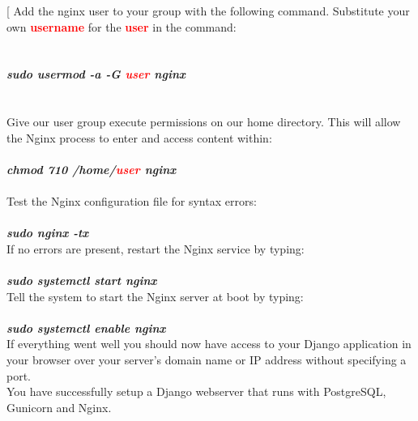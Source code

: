 \documentclass[a4paper]{article}
\makeatletter
\def\step{%
	\@ifnextchar[ \@myitem{\@noitemargtrue\@myitem[\@itemlabel]}}
\def\@myitem[#1]{\item[#1]\mbox{}\\}
\newenvironment{Step}{%
	\begin{enumerate}[label= \textbf {Step} \arabic*,align=left, leftmargin=1.0cm]%
	}{
\end{enumerate}%
}
\makeatother
\begin{document}
\begin{Step}
\step
Add the nginx user to your group with the following command. Substitute your own \textbf{\textcolor{red}{username}} for the \textbf{\textcolor{red}{user}} in the command:\\ \\\\
\textbf{\emph{ sudo usermod -a -G \textcolor{red}{user} nginx}}\\\\\\

Give our user group execute permissions on our home directory. This will allow the Nginx process to enter and access content within:\\\\
\textbf{\emph{chmod 710 /home/\textcolor{red}{user} nginx}}\\\\

Test the Nginx configuration file for syntax errors:\\\\
\textbf{\emph{sudo nginx -tx}}\\

If no errors are present, restart the Nginx service by typing:\\\\
\textbf{\emph{sudo systemctl start nginx}}\\

Tell the system to start the Nginx server at boot by typing:\\\\
\textbf{\emph{sudo systemctl enable nginx}}\\

If everything went well you should now have access to your Django application in your browser over your server's domain name or IP address without specifying a port.\\

You have successfully setup a Django webserver that runs with PostgreSQL, Gunicorn and Nginx.

\end{Step}

	\newpage	
	
		
	\clearpage 
\end{document}
